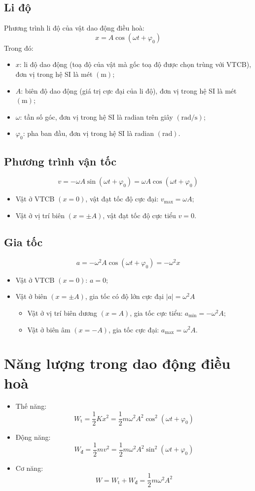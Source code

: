 \subsection{Li độ}
Phương trình li độ của vật dao động điều hoà:
$$x=A\cos\left(\omega t+\varphi_0\right)$$
Trong đó:
\begin{itemize}
	\item $x$: li độ dao động (toạ độ của vật mà gốc toạ độ được chọn trùng với VTCB), đơn vị trong hệ SI là mét $\left(\si{\meter}\right)$;
	\item $A$: biên độ dao động (giá trị cực đại của li độ), đơn vị trong hệ SI là mét $\left(\si{\meter}\right)$;
	\item $\omega$: tần số góc, đơn vị trong hệ SI là radian trên giây $\left(\si{\radian/\second}\right)$;
	\item $\varphi_0$: pha ban đầu, đơn vị trong hệ SI là radian $\left(\si{\radian}\right)$.
\end{itemize}
\subsection{Phương trình vận tốc}
$$v=-\omega A\sin\left(\omega t+\varphi_0\right)=\omega A\cos\left(\omega t+\varphi_0\right)$$
\begin{itemize}
	\item Vật ở VTCB $\left(x=0\right)$, vật đạt tốc độ cực đại: $v_\text{max}=\omega A$;
	\item Vật ở vị trí biên $\left(x=\pm A\right)$, vật đạt tốc độ cực tiểu $v=0$.
\end{itemize}
\subsection{Gia tốc}
$$a=-\omega^2A\cos\left(\omega t+\varphi_0\right)=-\omega^2x$$
\begin{itemize}
	\item Vật ở VTCB $\left(x=0\right)$: $a=0$;
	\item Vật ở biên $\left(x=\pm A\right)$, gia tốc có độ lớn cực đại $\left|a\right|=\omega^2 A$
	\begin{itemize}
		\item Vật ở vị trí biên dương $\left(x=A\right)$, gia tốc cực tiểu: $a_\text{min}=-\omega^2A$;
		\item Vật ở biên âm $\left(x=-A\right)$, gia tốc cực đại: $a_\text{max}=\omega^2 A$.
	\end{itemize}
\end{itemize}
\section{Năng lượng trong dao động điều hoà}
\begin{itemize}
	\item Thế năng:
	$$W_\text{t}=\dfrac{1}{2}Kx^2=\dfrac{1}{2}m\omega^2A^2\cos^2\left(\omega t+\varphi_0\right)$$
	\item Động năng:
	$$W_\text{đ}=\dfrac{1}{2}mv^2=\dfrac{1}{2}m\omega^2A^2\sin^2\left(\omega t+\varphi_0\right)$$
	\item Cơ năng:
	$$W=W_\text{t}+W_\text{đ}=\dfrac{1}{2}m\omega^2A^2$$
\end{itemize}

